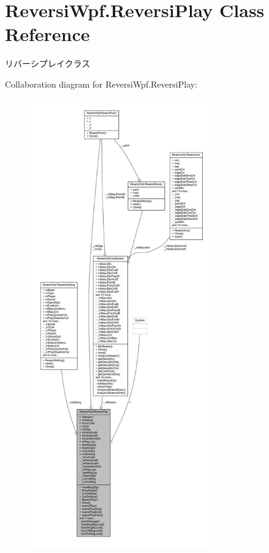 \hypertarget{class_reversi_wpf_1_1_reversi_play}{}\section{Reversi\+Wpf.\+Reversi\+Play Class Reference}
\label{class_reversi_wpf_1_1_reversi_play}


リバーシプレイクラス  




Collaboration diagram for Reversi\+Wpf.\+Reversi\+Play\+:
\nopagebreak
\begin{figure}[H]
\begin{center}
\leavevmode
\includegraphics[height=550pt]{class_reversi_wpf_1_1_reversi_play__coll__graph}
\end{center}
\end{figure}
